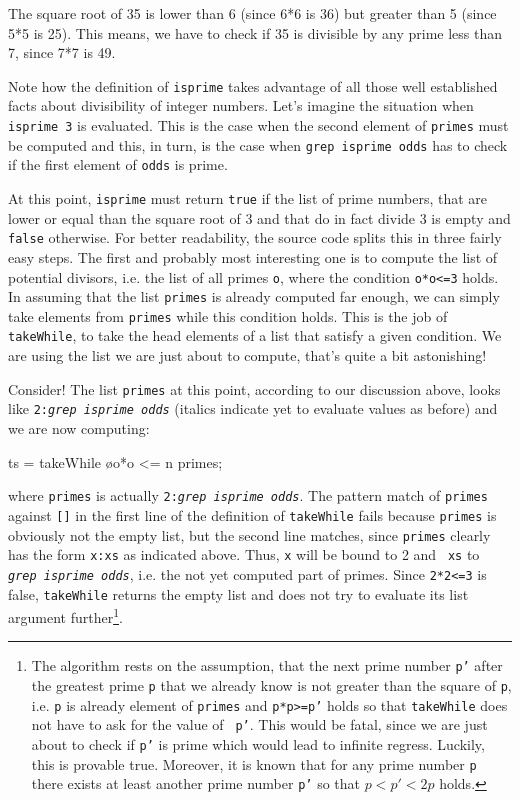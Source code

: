 \documentclass[a4paper,twocolumn,landscape]{report}
\newenvironment{code}[0]{\verbatim}{\endverbatim}
\begin{document}
The square root of 35 is lower than 6 (since 6*6 is 36) but greater than
5
(since 5*5 is 25). This means, we have to check if 35 is divisible by
any
prime less than 7, since 7*7 is 49.

Note how the definition of {\tt isprime} takes advantage of all those
well established facts about divisibility of integer numbers. Let's
imagine the situation when {\tt isprime 3} is evaluated. This is
the case when the
second element of {\tt primes} must be computed and this, in turn,
is the case when {\tt grep isprime odds} has to check if the first
element of {\tt odds} is
prime.

At this point, {\tt isprime} must return
{\tt true} if the list of prime numbers,
that are lower or equal than the square root of 3 and that do in
fact divide 3
is empty and {\tt false} otherwise.
For better readability, the source code splits this in
three fairly easy
steps. The first and probably most interesting one is to compute the
list of potential divisors, i.e. the list of all primes {\tt o},
where the condition {\tt o*o<=3} holds.
In assuming that the list {\tt primes} is already computed far enough,
we can simply take elements from {\tt primes} while this
condition holds. This is the job of {\tt takeWhile}, to take the head
elements of a list that satisfy a given condition. We are using the list
we are just about to compute, that's quite a bit astonishing!

Consider! The list {\tt primes} at this point, according to our
discussion above, looks like  {\tt 2:{\it grep isprime odds}}
(italics indicate yet to evaluate values as before)
and we are now
computing:

\begin{code}
ts = takeWhile \o{o*o <= n} primes;
\end{code}

where {\tt primes} is actually {\tt 2:{\it grep isprime odds}}.
The pattern match of {\tt primes} against {\tt []} in the first
line of the definition of {\tt takeWhile} fails
because {\tt primes} is obviously not the empty list,
but the second
line matches, since {\tt primes} clearly has the form {\tt x:xs}
as indicated above. Thus, {\tt x} will be bound to 2 and {\tt
xs} to {\tt {\it grep isprime odds}}, i.e. the not yet computed
part of primes. Since {\tt 2*2<=3} is false, {\tt takeWhile}
returns the empty list and does not try to evaluate its list
argument further\footnote{
The algorithm rests on the assumption, that the next prime number
{\tt p'} after
the greatest prime {\tt p} that we already know
is not greater than the square of {\tt p}, i.e.
{\tt p} is already element of {\tt primes} and
{\tt p*p>=p'}
holds so that {\tt takeWhile} does not have to ask for the value of {\tt
p'}. This would be fatal, since we are just about to check if {\tt p'}
is prime which would lead to infinite regress.
Luckily, this is provable true. Moreover, it is known that for any prime
number {\tt p} there exists at least another
prime number {\tt p'} so that
$p<p'<2p$ holds.
}.
\end{document}
